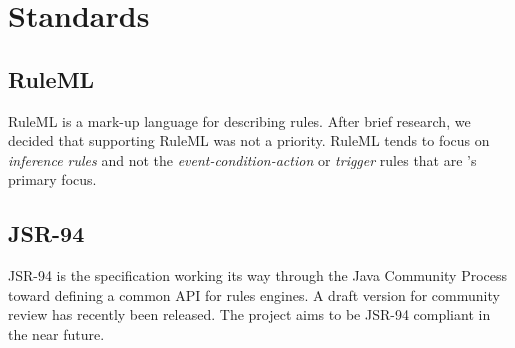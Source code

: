 \section{Standards}

\subsection{RuleML}

RuleML is a mark-up language for describing rules.  After brief
research, we decided that supporting RuleML was not a priority.
RuleML tends to focus on \emph{inference rules} and not the
\emph{event-condition-action} or \emph{trigger} rules that
are \drools{}'s primary focus.

\subsection{JSR-94}

JSR-94 is the specification working its way through the Java Community
Process toward defining a common API for rules engines.  A draft
version for community review has recently been released.  The
\drools{} project aims to be JSR-94 compliant in the near future.

